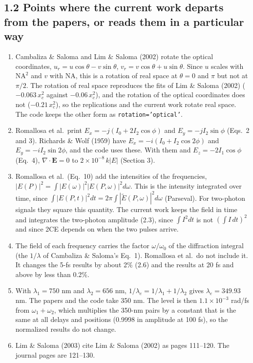 \documentclass[10pt]{article}
\begin{document}
\subsection*{1.2 Points where the current work departs from the papers, or reads them in a particular way}
\begin{enumerate}
\item Cambaliza \& Saloma and Lim \& Saloma (2002) rotate the optical coordinates,
$u_r = u\cos\theta - v\sin\theta$, $v_r = v\cos\theta + u\sin\theta$. Since $u$ scales with $\mathrm{NA}^2$ and $v$ with
NA, this is a rotation of real space at $\theta = 0$ and $\pi$ but not at $\pi/2$. The rotation of real space
reproduces the fits of Lim \& Saloma (2002) ($-0.063\,x_c^2$ against $-0.06\,x_c^2$), and the rotation of the optical
coordinates does not ($-0.21\,x_c^2$), so the replications and the current work rotate real space. The code keeps the
other form as \texttt{rotation='optical'}.
\item Romallosa et al.\ print $E_x = -j(I_0 + 2I_2\cos\phi)$ and $E_y = -jI_2\sin\phi$ (Eqs.~2 and 3). Richards \& Wolf
(1959) have $E_x = -i(I_0 + I_2\cos 2\phi)$ and $E_y = -iI_2\sin 2\phi$, and the code uses these. With them and
$E_z = -2I_1\cos\phi$ (Eq.~4), $\nabla\cdot\mathbf{E} = 0$ to $2\times10^{-8}\,k|E|$ (Section 3).
\item Romallosa et al.\ (Eq.~10) add the intensities of the frequencies,
$|E(P)|^2 = \int|E(\omega)|^2|E(P,\omega)|^2d\omega$. This is the intensity integrated over time, since
$\int|E(P,t)|^2dt = 2\pi\int|\tilde E(P,\omega)|^2d\omega$ (Parseval). For two-photon signals they square this
quantity. The current work keeps the field in time and integrates the two-photon amplitude (2.3), since
$\int I^2dt$ is not $(\int I\,dt)^2$ and since 2CE depends on when the two pulses arrive.
\item The field of each frequency carries the factor $\omega/\omega_0$ of the diffraction integral (the $1/\lambda$ of
Cambaliza \& Saloma's Eq.~1). Romallosa et al.\ do not include it. It changes the 5-fs results by about 2\% (2.6) and
the results at 20 fs and above by less than 0.2\%.
\item With $\lambda_1 = 750$ nm and $\lambda_2 = 656$ nm, $1/\lambda_e = 1/\lambda_1 + 1/\lambda_2$ gives
$\lambda_e = 349.93$ nm. The papers and the code take 350 nm. The level is then $1.1\times10^{-3}$ rad/fs from
$\omega_1 + \omega_2$, which multiplies the 350-nm pairs by a constant that is the same at all delays and positions
(0.9998 in amplitude at 100 fs), so the normalized results do not change.
\item Lim \& Saloma (2003) cite Lim \& Saloma (2002) as pages 111--120. The journal pages are 121--130.
\end{enumerate}
\end{document}
